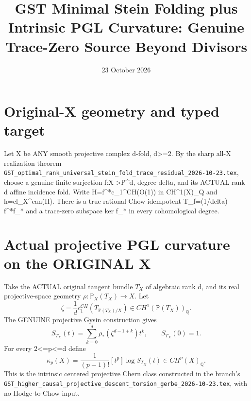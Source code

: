 \documentclass[11pt]{article}
\title{GST Minimal Stein Folding plus Intrinsic PGL Curvature: Genuine Trace-Zero Source Beyond Divisors}
\date{23 October 2026}
\begin{document}
\maketitle
\section{Original-X geometry and typed target}
Let X be ANY smooth projective complex d-fold, d>=2.
By the sharp all-X realization theorem
\texttt{GST\_optimal\_rank\_universal\_stein\_fold\_trace\_residual\_2026-10-23.tex},
choose a genuine finite surjection f:X->P^d,
degree delta, and its ACTUAL rank-d affine
incidence fold. Write H=f^*c_1^{CH}(O(1))
in CH^1(X)_Q and h=cl_X^{can}(H).
There is a true rational Chow idempotent
T_f=(1/delta) f^*f_* and a trace-zero
subspace ker f_* in every cohomological degree.

\section{Actual projective PGL curvature on the ORIGINAL X}
Take the ACTUAL original tangent bundle
$T_X$ of algebraic rank d, and its real
projective-space geometry
$\rho:\mathbb P_X(T_X)\to X$.
Let
\[
 \zeta=\frac1d c_1^{CH}(T_{\mathbb P(T_X)/X})
       \in CH^1(\mathbb P(T_X))_{\mathbb Q}.
\]
The GENUINE projective Gysin construction gives
\[
 S_{T_X}(t)=\sum_{k=0}^{d}
   \rho_*(\zeta^{d-1+k})t^k,\qquad S_{T_X}(0)=1.
\]
For every 2<=p<=d define
\[
 \boxed{\kappa_p(X)=\frac1{(p-1)!}
        [t^p]\log S_{T_X}(t)
       \in CH^p(X)_{\mathbb Q}.}                    \tag{1}
\]
This is the intrinsic centered projective
Chern class constructed in the branch's
\texttt{GST\_higher\_causal\_projective\_descent\_torsion\_gerbe\_2026-10-23.tex},
with no Hodge-to-Chow input.
\end{document}
